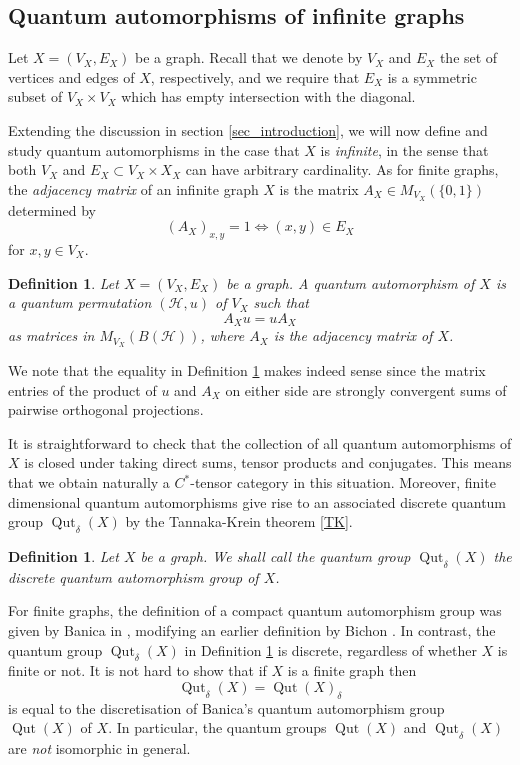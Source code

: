 \documentclass[a4paper]{amsart}
\newcommand*{\Hc}{\mathcal{H}}
\DeclareMathOperator{\Qut}{Qut}
\numberwithin{equation}{section}
\theoremstyle{change}
\newtheorem{definition}[theorem]{Definition}
\begin{document}
\subsection{Quantum automorphisms of infinite graphs} 

Let $ X = (V_X, E_X) $ be a graph. Recall that we denote by $ V_X $ and $ E_X $ the set of vertices and edges of $ X $, respectively, and we require that $ E_X $ is a symmetric subset  of $ V_X \times V_X $ which has empty intersection with the diagonal. 

Extending the discussion in section \ref{sec_introduction}, we will now define and study quantum automorphisms in the case that $ X $ is  \emph{infinite}, in the sense that both $ V_X $ and $ E_X \subset V_X \times X_X $ can have arbitrary cardinality. 
As for finite graphs, the \emph{adjacency matrix} of an infinite graph $ X $ is the matrix $ A_X \in M_{V_X}(\{0,1\}) $ determined by 
$$
(A_X)_{x,y} = 1 \Leftrightarrow (x,y) \in E_X
$$
for $ x,y \in V_X $. 

\begin{definition} \label{defquantumautomorphismgraph}
Let $ X = (V_X, E_X) $ be a graph. A quantum automorphism of $ X $ is a quantum permutation $ (\Hc, u) $ of $ V_X $ such that 
$$ 
A_X u = u A_X 
$$ 
as matrices in $ M_{V_X}(B(\Hc)) $, where $ A_X $ is the adjacency matrix of $ X $. 
\end{definition} 

We note that the equality in Definition \ref{defquantumautomorphismgraph} makes indeed sense since the matrix entries of the product of $ u $ and $ A_X $ on either side are strongly convergent sums of pairwise orthogonal projections. 

It is straightforward to check that the collection of all quantum automorphisms of $ X $ is closed under taking direct sums, tensor products and conjugates. 
This means that we obtain naturally a $ C^* $-tensor category in this situation. Moreover, finite dimensional quantum automorphisms give rise to an associated discrete quantum group $ \Qut_\delta(X) $ by the Tannaka-Krein theorem \ref{TK}. 

\begin{definition} \label{defqutinfinitegraph}
Let $ X $ be a graph. We shall call the quantum group $ \Qut_\delta(X) $ the discrete quantum automorphism group of $ X $. 
\end{definition} 

For finite graphs, the definition of a compact quantum automorphism group was given by Banica in \cite{BANICA_quthomogeneousgraphs}, modifying an earlier definition by Bichon \cite{BICHON_qutgraphs}. In contrast, the quantum group $ \Qut_\delta(X) $ in Definition \ref{defqutinfinitegraph} is discrete, regardless of whether $ X $ is finite or not. 
It is not hard to show that if $ X $ is a finite graph then 
$$ 
\Qut_\delta(X) = \Qut(X)_\delta 
$$ 
is equal to the discretisation of Banica's quantum automorphism group $ \Qut(X) $ of $ X $. 
In particular, the quantum groups $ \Qut(X) $ and $ \Qut_\delta(X) $ are \emph{not} isomorphic in general. 
\end{document}
